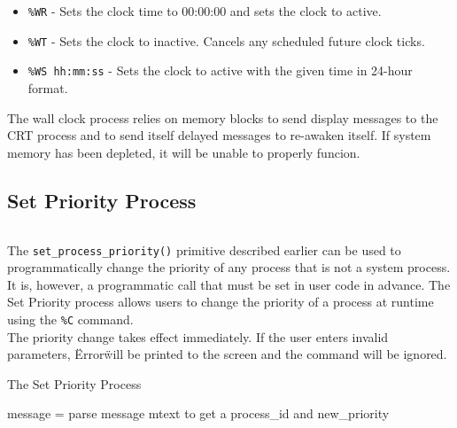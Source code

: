 \documentclass[12pt]{report}
\begin{document}
\begin{itemize}

\item {\tt \%WR} - Sets the clock time to 00:00:00 and sets the clock to active.\\
\item {\tt \%WT} - Sets the clock to inactive. Cancels any scheduled future clock ticks.\\
\item {\tt \%WS hh:mm:ss} - Sets the clock to active with the given time in 24-hour format.\\

\end{itemize}

The wall clock process relies on memory blocks to send display messages to the CRT process and to send itself delayed messages to re-awaken itself. If system memory has been depleted, it will be unable to properly funcion.\\

\subsection{Set Priority Process}

\begin{minipage}{\textwidth}
\begin{lstlisting}[language=C, frame=single]
%C process_id new_priority
\end{lstlisting}
\end{minipage}

The {\tt set\_process\_priority()} primitive described earlier can be used to programmatically change the priority of any process that is not a system process. It is, however, a programmatic call that must be set in user code in advance. The Set Priority process allows users to change the priority of a process at runtime using the {\tt \%C} command.\\

The priority change takes effect immediately. If the user enters invalid parameters, \"Error\" will be printed to the screen and the command will be ignored.\\

\begin{algorithm}
  \caption{The Set Priority Process}
  \begin{algorithmic}[1]
			\State message = 
			\State parse message mtext to get a process_id and new_priority
				\State {}
			\Else
			\EndIf
			\State {}
		\EndWhile
    \EndProcedure
  \end{algorithmic}
\end{algorithm}
\end{document}
